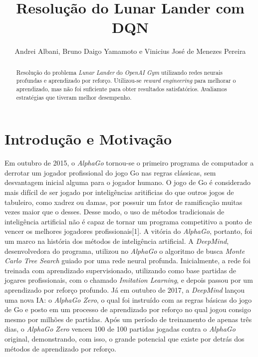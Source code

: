\documentclass[letterpaper, 10 pt, conference]{ieeeconf}  %
\title{\LARGE \bf
Resolução do Lunar Lander com DQN 
}
\author{Andrei Albani, Bruno Daigo Yamamoto e Vinicius José de Menezes Pereira}%
\begin{document}
\maketitle
\thispagestyle{empty}
\pagestyle{empty}


\begin{abstract}
Resolução do problema \emph{Lunar Lander} do \emph{OpenAI Gym} utilizando redes neurais profundas e aprendizado por reforço. Utilizou-se \emph{reward engineering} para melhorar o aprendizado, mas não foi suficiente para obter resultados satisfatórios. Avaliamos estratégias que tiveram melhor desempenho.


\end{abstract}


\section{Introdução e Motivação}

Em outubro de 2015, o \emph{AlphaGo} tornou-se o primeiro programa de computador a derrotar um jogador profissional do jogo Go nas regras clássicas, sem desvantagem inicial alguma para o jogador humano. O jogo de Go é considerado mais difícil de ser jogado por inteligências aritificias do que outros jogos de tabuleiro, como xadrez ou damas, por possuir um fator de ramificação muitas vezes maior que o desses. Desse modo, o uso de métodos tradicionais de inteligência artificial não é capaz de tornar um programa competitivo a ponto de vencer os melhores jogadores profissionais[1]. A vitória do \emph{AlphaGo}, portanto, foi um marco na história dos métodos de inteligência artificial. A \emph{DeepMind}, desenvolvedora do programa, utilizou no \emph{AlphaGo} o algoritmo de busca \emph{Monte Carlo Tree Search} guiado por uma rede neural profunda. Inicialmente, a rede foi treinada com aprendizado supervisionado, utilizando como base partidas de jogares profissionais, com o chamado \emph{Imitation Learning}, e depois passou por um aprendizado por reforço profundo. Já em outubro de 2017, a \emph{DeepMind} lançou uma nova IA: o \emph{AlphaGo Zero}, o qual foi instruído com as regras básicas do jogo de Go e posto em um processo de aprendizado por reforço no qual jogou consigo mesmo por milhões de partidas. Após um período de treinamento de apenas três dias, o \emph{AlphaGo Zero} venceu 100 de 100 partidas jogadas contra o \emph{AlphaGo} original, demonstrando, com isso, o grande potencial que existe por detrás dos métodos de aprendizado por reforço.
\end{document}
